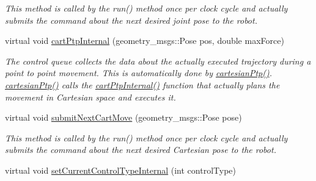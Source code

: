 \begin{DoxyCompactItemize}
\begin{DoxyCompactList}\small\item\em This method is called by the run() method once per clock cycle and actually submits the command about the next desired joint pose to the robot. \end{DoxyCompactList}\item 
virtual void \hyperlink{classkukadu_1_1KukieControlQueue_af5ae9a7107d58e35f340f24fcb3785db}{cart\+Ptp\+Internal} (geometry\+\_\+msgs\+::\+Pose pos, double max\+Force)\hypertarget{classkukadu_1_1KukieControlQueue_af5ae9a7107d58e35f340f24fcb3785db}{}\label{classkukadu_1_1KukieControlQueue_af5ae9a7107d58e35f340f24fcb3785db}

\begin{DoxyCompactList}\small\item\em The control queue collects the data about the actually executed trajectory during a point to point movement. This is automatically done by \hyperlink{classkukadu_1_1ControlQueue_a1bfa23a8ce6319f6ef0ed9208e896054}{cartesian\+Ptp()}. \hyperlink{classkukadu_1_1ControlQueue_a1bfa23a8ce6319f6ef0ed9208e896054}{cartesian\+Ptp()} calls the \hyperlink{classkukadu_1_1KukieControlQueue_af5ae9a7107d58e35f340f24fcb3785db}{cart\+Ptp\+Internal()} function that actually plans the movement in Cartesian space and executes it. \end{DoxyCompactList}\item 
virtual void \hyperlink{classkukadu_1_1KukieControlQueue_a7976aea7ef93fe9c96d017309e11e2c1}{submit\+Next\+Cart\+Move} (geometry\+\_\+msgs\+::\+Pose pose)\hypertarget{classkukadu_1_1KukieControlQueue_a7976aea7ef93fe9c96d017309e11e2c1}{}\label{classkukadu_1_1KukieControlQueue_a7976aea7ef93fe9c96d017309e11e2c1}

\begin{DoxyCompactList}\small\item\em This method is called by the run() method once per clock cycle and actually submits the command about the next desired Cartesian pose to the robot. \end{DoxyCompactList}\item 
virtual void \hyperlink{classkukadu_1_1KukieControlQueue_ade8c63d5fad6dedbbd89b1f1a8915191}{set\+Current\+Control\+Type\+Internal} (int control\+Type)\hypertarget{classkukadu_1_1KukieControlQueue_ade8c63d5fad6dedbbd89b1f1a8915191}{}\label{classkukadu_1_1KukieControlQueue_ade8c63d5fad6dedbbd89b1f1a8915191}


\end{DoxyCompactItemize}
